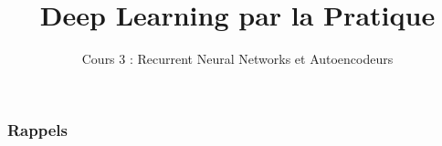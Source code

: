 \documentclass{formation}
\title{Deep Learning par la Pratique}
\subtitle{Cours 3 : Recurrent Neural Networks et Autoencodeurs}
\begin{document}
\maketitle

\begin{frame}
  \frametitle{Rappels}
\end{frame}
\end{document}
